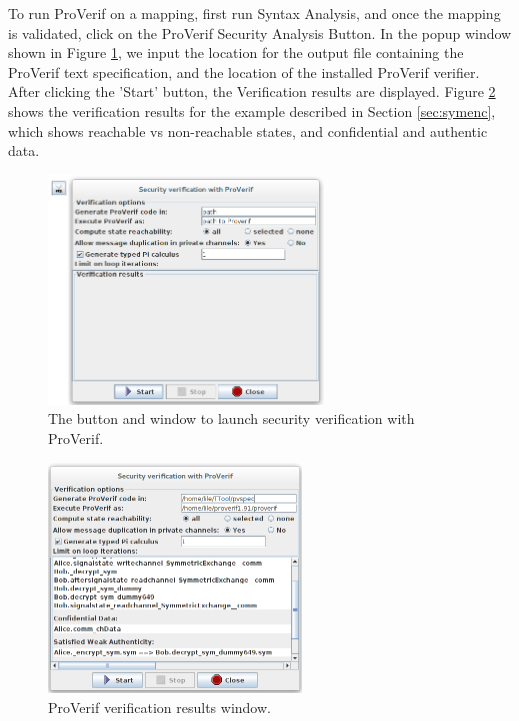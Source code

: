 \documentclass{llncs}
\begin{document}
To run ProVerif on a mapping, first run Syntax Analysis, and once the mapping is validated, click on the ProVerif Security Analysis Button. In the popup window shown in Figure \ref{fig:ProVerifWindow}, we input the location for the output file containing the ProVerif text specification, and the location of the installed ProVerif verifier. After clicking the 'Start' button, the Verification results are displayed. Figure \ref{fig:ProVerifWindowRes} shows the verification results for the example described in Section \ref{sec:symenc}, which shows reachable vs non-reachable states, and confidential and authentic data.


\begin{figure}[!htbp]
	\centering
	\includegraphics[width=0.65\textwidth]{figures/securityStuff/ProVerifWindow.png}
	\caption{The button and window to launch security verification with ProVerif.}
	\label{fig:ProVerifWindow}
\end{figure}

\begin{figure}[!htbp]
	\centering
	\includegraphics[width=0.6\textwidth]{figures/securityStuff/ProVerifWindowRes.png}
	\caption{ProVerif verification results window.}
	\label{fig:ProVerifWindowRes}
\end{figure}
\end{document}

